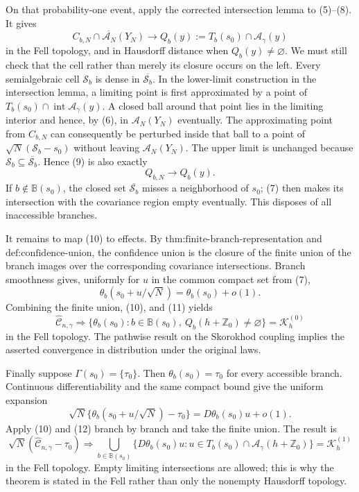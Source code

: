 On that probability-one event, apply the corrected intersection lemma to (5)--(8).  It gives
\[
 \overline{C_{b,N}\cap\mathcal A_N(Y_N)}
 \longrightarrow
 Q_b(y):=T_b(s_0)\cap\mathcal A_\gamma(y) \tag{9}
\]
in the Fell topology, and in Hausdorff distance when \(Q_b(y)\ne\varnothing\).  We must still check that the cell rather than merely its closure occurs on the left.  Every semialgebraic cell \(\mathcal S_b\) is dense in \(\overline{\mathcal S_b}\).  In the lower-limit construction in the intersection lemma, a limiting point is first approximated by a point of \(T_b(s_0)\cap\operatorname{int}\mathcal A_\gamma(y)\).  A closed ball around that point lies in the limiting interior and hence, by (6), in \(\mathcal A_N(Y_N)\) eventually.  The approximating point from \(C_{b,N}\) can consequently be perturbed inside that ball to a point of \(\sqrt N(\mathcal S_b-s_0)\) without leaving \(\mathcal A_N(Y_N)\).  The upper limit is unchanged because \(\mathcal S_b\subseteq\overline{\mathcal S_b}\).  Hence (9) is also exactly
\[
 Q_{b,N}\longrightarrow Q_b(y). \tag{10}
\]
If \(b\notin\mathbb B(s_0)\), the closed set \(\overline{\mathcal S_b}\) misses a neighborhood of \(s_0\); (7) then makes its intersection with the covariance region empty eventually.  This disposes of all inaccessible branches.

It remains to map (10) to effects.  By \(\text{thm:finite-branch-representation}\) and \(\text{def:confidence-union}\), the confidence union is the closure of the finite union of the branch images over the corresponding covariance intersections.  Branch smoothness gives, uniformly for \(u\) in the common compact set from (7),
\[
 \theta_b(s_0+u/\sqrt N)=\theta_b(s_0)+o(1). \tag{11}
\]
Combining the finite union, (10), and (11) yields
\[
 \widehat{\mathcal C}_{n,\gamma}\Rightarrow
 \{\theta_b(s_0):b\in\mathbb B(s_0),\ Q_b(h+\mathbb Z_0)\ne\varnothing\}
 =\mathcal K_h^{(0)}
\]
in the Fell topology.  The pathwise result on the Skorokhod coupling implies the asserted convergence in distribution under the original laws.

Finally suppose \(\Gamma(s_0)=\{\tau_0\}\).  Then \(\theta_b(s_0)=\tau_0\) for every accessible branch.  Continuous differentiability and the same compact bound give the uniform expansion
\[
 \sqrt N\{\theta_b(s_0+u/\sqrt N)-\tau_0\}
 =D\theta_b(s_0)u+o(1). \tag{12}
\]
Apply (10) and (12) branch by branch and take the finite union.  The result is
\[
 \sqrt N(\widehat{\mathcal C}_{n,\gamma}-\tau_0)
 \Rightarrow
 \bigcup_{b\in\mathbb B(s_0)}
 \{D\theta_b(s_0)u:u\in T_b(s_0)\cap\mathcal A_\gamma(h+\mathbb Z_0)\}
 =\mathcal K_h^{(1)}
\]
in the Fell topology.  Empty limiting intersections are allowed; this is why the theorem is stated in the Fell rather than only the nonempty Hausdorff topology.